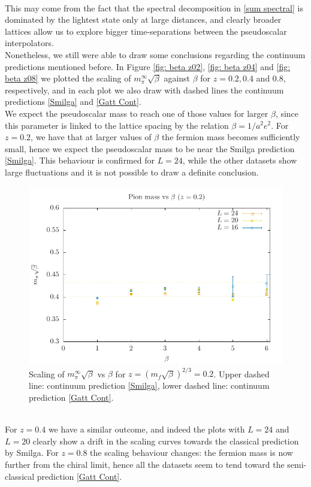\\ This may come from the fact that the spectral decomposition in \eqref{sum spectral} is dominated by the lightest state only at large distances, and clearly broader lattices allow us to explore bigger time-separations between the pseudoscalar interpolators.
\\ Nonetheless, we still were able to draw some conclusions regarding the continuum predictions mentioned before. In Figure \eqref{fig: beta z02}, \eqref{fig: beta z04} and \eqref{fig: beta z08} we plotted the scaling of $m_\pi^{\infty}\sqrt{\beta}$ against $\beta$ for $z = 0.2, 0.4$ and $0.8$, respectively, and in each plot we also draw with dashed lines the continuum predictions \eqref{Smilga} and \eqref{Gatt Cont}. 
\\ We expect the pseudoscalar mass to reach one of those values for larger $\beta$, since this parameter is linked to the lattice spacing by the relation $\beta = 1/a^2e^2$. For $z = 0.2$, we have that at larger values of $\beta$ the fermion mass becomes sufficiently small, hence we expect the pseudoscalar mass to be near the Smilga prediction \eqref{Smilga}. This behaviour is confirmed for $L = 24$, while the other datasets show large fluctuations and it is not possible to draw a definite conclusion.
\begin{figure}
    \centering
    \includegraphics[width=0.8\linewidth]{images/beta02.pdf}
    \caption{Scaling of $m_\pi^{\infty}\sqrt{\beta}$ vs $\beta$ for $z = (m_f \sqrt{\beta})^{2/3} = 0.2$. Upper dashed line: continuum prediction \eqref{Smilga}, lower dashed line: continuum prediction \eqref{Gatt Cont}.}
    \label{fig: beta z02}
\end{figure}
\\ For $z = 0.4$ we have a similar outcome, and indeed the plots with $L = 24$ and $L = 20$ clearly show a drift in the scaling curves towards the classical prediction by Smilga. For $z = 0.8$ the scaling behaviour changes: the fermion mass is now further from the chiral limit, hence all the datasets seem to tend toward the semi-classical prediction \eqref{Gatt Cont}. 
